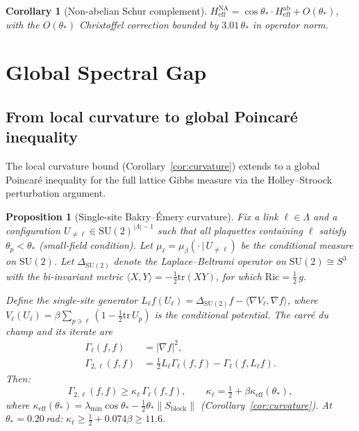 \documentclass[11pt]{article}
\newtheorem{proposition}[theorem]{Proposition}
\newtheorem{corollary}[theorem]{Corollary}
\theoremstyle{definition}
\newcommand{\SU}{\mathrm{SU}}
\newcommand{\tr}{\mathrm{tr}}
\begin{document}
\begin{corollary}[Non-abelian Schur complement]\label{cor:NAschur}
$H_{\mathrm{eff}}^{\mathrm{NA}}=\cos\theta_*\cdot
H_{\mathrm{eff}}^{\mathrm{ab}}+O(\theta_*)$, with the
$O(\theta_*)$ Christoffel correction bounded by
$3.01\,\theta_*$ in operator norm.
\end{corollary}

\section{Global Spectral Gap}\label{sec:global}

\subsection{From local curvature to global Poincar\'e inequality}

The local curvature bound (Corollary~\ref{cor:curvature}) extends to a
global Poincar\'e inequality for the full lattice Gibbs measure via the
Holley--Stroock perturbation argument.

\begin{proposition}[Single-site Bakry--\'Emery curvature]%
\label{prop:single-site-BE}
Fix a link $\ell\in\Lambda$ and a configuration
$U_{\neq\ell}\in\SU(2)^{|\Lambda|-1}$ such that all plaquettes
containing $\ell$ satisfy $\theta_p<\theta_*$ (small-field condition).
Let $\mu_\ell=\mu_\beta(\cdot\,|\,U_{\neq\ell})$ be the conditional
measure on $\SU(2)$.  Let $\Delta_{\SU(2)}$ denote the
Laplace--Beltrami operator on $\SU(2)\cong S^3$ with the bi-invariant
metric $\langle X,Y\rangle=-\frac{1}{2}\tr(XY)$, for which
$\mathrm{Ric}=\frac{1}{2}\,g$.

Define the \emph{single-site generator}
$L_\ell f(U_\ell)=\Delta_{\SU(2)}f-\langle\nabla V_\ell,\nabla f\rangle$,
where $V_\ell(U_\ell)=\beta\sum_{p\ni\ell}(1-\frac{1}{2}\tr\,U_p)$
is the conditional potential.  The \emph{carr\'e du champ} and its
iterate are
\begin{align}
\Gamma_\ell(f,f)&=|\nabla f|^2,\\
\Gamma_{2,\ell}(f,f)&=\tfrac{1}{2}L_\ell\Gamma_\ell(f,f)
-\Gamma_\ell(f,L_\ell f).
\end{align}
Then:
\begin{equation}\label{eq:single-site-BE}
\Gamma_{2,\ell}(f,f)
\ge\kappa_\ell\,\Gamma_\ell(f,f),
\qquad
\kappa_\ell=\tfrac{1}{2}+\beta\kappa_{\mathrm{eff}}(\theta_*),
\end{equation}
where $\kappa_{\mathrm{eff}}(\theta_*)
=\lambda_{\min}\cos\theta_*
-\frac{1}{2}\theta_*\|S_{\mathrm{block}}\|$
(Corollary~\ref{cor:curvature}).  At $\theta_*=0.20$\,rad:
$\kappa_\ell\ge\frac{1}{2}+0.074\beta\ge 11.6$.
\end{proposition}
\end{document}
